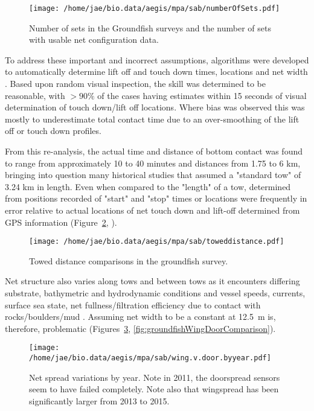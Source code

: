\documentclass[letterpaper,portrait,11pt]{scrartcl}
\numberwithin{equation}{section}    %
\numberwithin{figure}{section}    %
\numberwithin{table}{section}       %
\begin{document}
\begin{figure}
  \centering
  \texttt{[image: /home/jae/bio.data/aegis/mpa/sab/numberOfSets.pdf]}
  \caption{Number of sets in the Groundfish surveys and the number of sets with usable net configuration data.}
  \label{fig:groundfishNoSets}
\end{figure}

To address these important and incorrect assumptions, algorithms were developed to automatically determine lift off and touch down times, locations and net width \parencite{Munden:2017nets}. Based upon random visual inspection, the skill was determined to be reasonable, with $>90\%$ of the cases having estimates within 15 seconds of visual determination of touch down/lift off locations. Where bias was observed this was mostly to underestimate total contact time due to an over-smoothing of the lift off or touch down profiles.

From this re-analysis, the actual time and distance of bottom contact was found to range from approximately 10 to 40 minutes and distances from 1.75 to 6 km, bringing into question many historical studies that assumed a "standard tow" of 3.24 km in length. Even when compared to the "length" of a tow, determined from positions recorded of "start" and "stop" times or locations were frequently in error relative to actual locations of net touch down and lift-off determined from GPS information (Figure~\ref{fig:groundfishTowDistance}, \textcite{Munden:2017nets}).


\begin{figure}
  \centering
  \texttt{[image: /home/jae/bio.data/aegis/mpa/sab/toweddistance.pdf]}
  \caption{Towed distance comparisons in the groundfish survey.}
  \label{fig:groundfishTowDistance}
\end{figure}

Net structure also varies along tows and between tows as it encounters differing substrate, bathymetric and hydrodynamic conditions and vessel speeds, currents, surface sea state, net fullness/filtration efficiency due to contact with rocks/boulders/mud \parencite{Munden:2017nets}. Assuming net width to be a constant at 12.5~m is, therefore, problematic (Figures~\ref{fig:groundfishWingDoorAnnual}, \ref{fig:groundfishWingDoorComparison}).




\begin{figure}
  \centering
  \texttt{[image: /home/jae/bio.data/aegis/mpa/sab/wing.v.door.byyear.pdf]}
  \caption{Net spread variations by year. Note in 2011, the doorspread sensors seem to have failed completely. Note also that wingspread has been significantly larger from 2013 to 2015.}
  \label{fig:groundfishWingDoorAnnual}
\end{figure}
\end{document}

